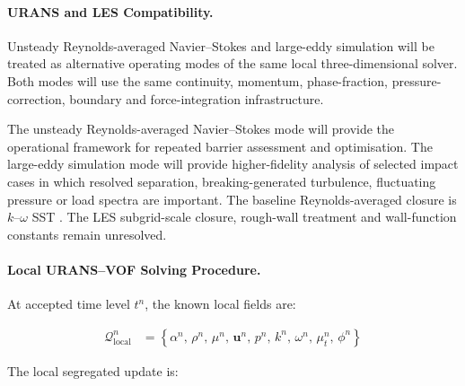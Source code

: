 \paragraph{URANS and LES Compatibility.}
\label{sec:num-local-three-dimensional-turbulence-compatibility}

Unsteady Reynolds-averaged Navier--Stokes and large-eddy simulation will
be treated as alternative operating modes of the same local
three-dimensional solver. Both modes will use the same continuity,
momentum, phase-fraction, pressure-correction, boundary and
force-integration infrastructure.

The unsteady Reynolds-averaged Navier--Stokes mode will provide the
operational framework for repeated barrier assessment and optimisation.
The large-eddy simulation mode will provide higher-fidelity analysis of
selected impact cases in which resolved separation, breaking-generated
turbulence, fluctuating pressure or load spectra are important. The
baseline Reynolds-averaged closure is $k$--$\omega$ SST
\parencite{menter1994twoequation}. The LES subgrid-scale closure,
rough-wall treatment and wall-function constants remain unresolved.

\paragraph{Local URANS--VOF Solving Procedure.}
\label{sec:num-local-three-dimensional-solving-procedure}

At accepted time level $t^n$, the known local fields are:

\begin{align}
  \mathcal{Q}^{n}_{\mathrm{local}}
  &=
  \left\{
    \alpha^n,\,
    \rho^n,\,
    \mu^n,\,
    \mathbf{u}^n,\,
    p^n,\,
    k^n,\,
    \omega^n,\,
    \mu_t^n,\,
    \phi^n
  \right\}
  \label{eq:res-num-spec-local-known-fields}
\end{align}

The local segregated update is:


